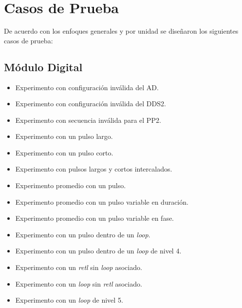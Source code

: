 \section{Casos de Prueba}

De acuerdo con los enfoques generales y por unidad se dise\~naron los siguientes casos de prueba:

\subsection{M\'odulo Digital}
\begin{itemize}
\item Experimento con configuraci\'on inv\'alida del AD.
\item Experimento con configuraci\'on inv\'alida del DDS2.
\item Experimento con secuencia inv\'alida para el PP2.
\item Experimento con un pulso largo.
\item Experimento con un pulso corto.
\item Experimento con pulsos largos y cortos intercalados.
\item Experimento promedio con un pulso.
\item Experimento promedio con un pulso variable en duraci\'on.
\item Experimento promedio con un pulso variable en fase.
\item Experimento con un pulso dentro de un \textit{loop}.
\item Experimento con un pulso dentro de un \textit{loop} de nivel 4.
\item Experimento con un \textit{retl} sin \textit{loop} asociado.
\item Experimento con un \textit{loop} sin \textit{retl} asociado.
\item Experimento con un \textit{loop} de nivel 5.
\end{itemize}

